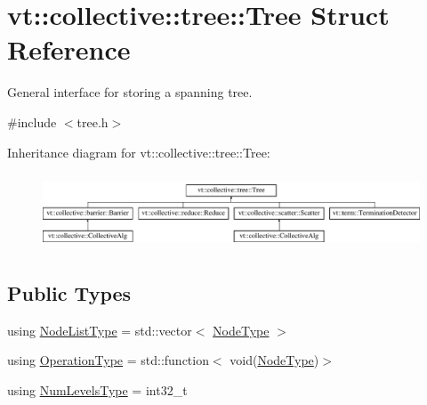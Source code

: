 \hypertarget{structvt_1_1collective_1_1tree_1_1_tree}{}\section{vt\+:\+:collective\+:\+:tree\+:\+:Tree Struct Reference}
\label{structvt_1_1collective_1_1tree_1_1_tree}


General interface for storing a spanning tree.  




{\ttfamily \#include $<$tree.\+h$>$}

Inheritance diagram for vt\+:\+:collective\+:\+:tree\+:\+:Tree\+:\begin{figure}[H]
\begin{center}
\leavevmode
\includegraphics[height=2.270270cm]{structvt_1_1collective_1_1tree_1_1_tree}
\end{center}
\end{figure}
\subsection*{Public Types}
\begin{DoxyCompactItemize}
\item 
using \hyperlink{structvt_1_1collective_1_1tree_1_1_tree_a834e7b54ea2dceae42db7c5ea859753f}{Node\+List\+Type} = std\+::vector$<$ \hyperlink{namespacevt_a866da9d0efc19c0a1ce79e9e492f47e2}{Node\+Type} $>$
\item 
using \hyperlink{structvt_1_1collective_1_1tree_1_1_tree_a5ce4242e9580c807baa74168401f381a}{Operation\+Type} = std\+::function$<$ void(\hyperlink{namespacevt_a866da9d0efc19c0a1ce79e9e492f47e2}{Node\+Type})$>$
\item 
using \hyperlink{structvt_1_1collective_1_1tree_1_1_tree_af64acc9543dc1bd1b56d6ed17b003425}{Num\+Levels\+Type} = int32\+\_\+t
\end{DoxyCompactItemize}
